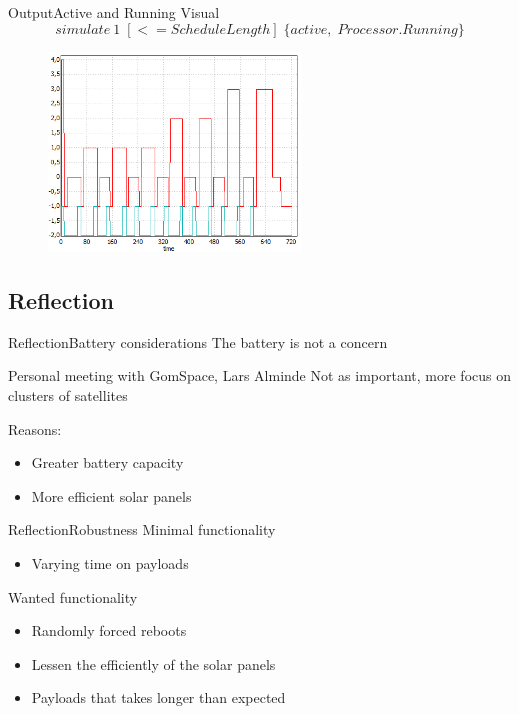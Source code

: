 \begin{frame}{Output}{Active and Running Visual}
	\begin{equation*}
		simulate\ 1 \; [<=ScheduleLength] \; \{active, \; Processor.Running\}
	\end{equation*}
	\begin{figure} %
		\includegraphics[width=0.6\textwidth]{graphics/activeprocessor.png}
		\end{figure}
\end{frame}

\subsection{Reflection}
\begin{frame}{Reflection}{Battery considerations}
	The battery is not a concern
	\begin{block}{Personal meeting with GomSpace, Lars Alminde}
		Not as important, more focus on clusters of satellites
	\end{block}
	Reasons:
	\begin{itemize}
		\item Greater battery capacity
		\item More efficient solar panels
	\end{itemize}
\end{frame}

\begin{frame}{Reflection}{Robustness}
	Minimal functionality
	\begin{itemize}
		\item Varying time on payloads
	\end{itemize}
	Wanted functionality
	\begin{itemize}
		\item Randomly forced reboots
		\item Lessen the efficiently of the solar panels
		\item Payloads that takes longer than expected
	\end{itemize}
\end{frame}

